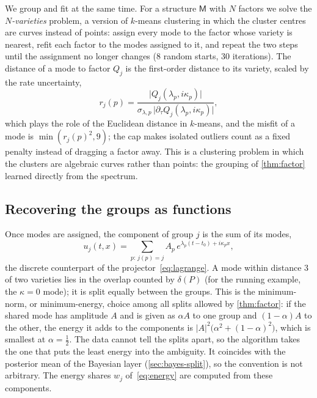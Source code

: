 \documentclass[11pt]{article}
\theoremstyle{plain}
\theoremstyle{definition}
\theoremstyle{remark}
\newcommand{\deltaP}{\delta(P)}             %
\newcommand{\Mfit}{\mathsf{M}}              %
\newcommand{\abs}[1]{\lvert#1\rvert}
\begin{document}
We group and fit at the same time. For a structure $\Mfit$ with $N$ factors we solve the
\emph{$N$-varieties} problem, a version of $k$-means clustering in which the cluster centres are curves instead of
points: assign every mode to the factor whose variety is nearest, refit each factor to the modes assigned to it, and
repeat the two steps until the assignment no longer changes (8 random starts, 30 iterations). The distance of a mode to factor $Q_j$ is
the first-order distance to its variety, scaled by the rate uncertainty,
\begin{equation}\label{eq:vardist}
  r_j(p)=\frac{\abs{Q_j(\lambda_p,i\kappa_p)}}{\sigma_{\lambda,p}\,\abs{\partial_\tau Q_j(\lambda_p,i\kappa_p)}},
\end{equation}
which plays the role of the Euclidean distance in $k$-means, and the misfit of a mode is $\min(r_j(p)^2,9)$; the cap makes isolated outliers count as a fixed
penalty instead of dragging a factor away. This is a clustering problem in which the clusters are
algebraic curves rather than points: the grouping of \cref{thm:factor} learned directly from the
spectrum.



\subsection{Recovering the groups as functions}\label{sec:alg-components}
Once modes are assigned, the component of group $j$ is the sum of its modes,
\begin{equation}\label{eq:uj}
  u_j(t,x)=\sum_{p:\,j(p)=j}A_p\,e^{\lambda_p(t-t_0)+i\kappa_px},
\end{equation}
the discrete counterpart of the projector~\eqref{eq:lagrange}. A mode within distance $3$ of two
varieties lies in the overlap counted by $\deltaP$ (for the running example, the $\kappa=0$ mode); it is
split equally between the groups. This is the minimum-norm, or minimum-energy, choice among all splits allowed by
\cref{thm:factor}: if the shared mode has amplitude $A$ and is given as $\alpha A$ to one group and $(1-\alpha)A$ to the
other, the energy it adds to the components is $\abs{A}^2\big(\alpha^2+(1-\alpha)^2\big)$, which is smallest at
$\alpha=\tfrac12$. The data cannot tell the splits apart, so the algorithm takes the one that puts the least energy
into the ambiguity. It coincides with the posterior mean of the Bayesian layer (\cref{sec:bayes-split}), so the
convention is not arbitrary. The energy shares $w_j$ of~\eqref{eq:energy}
are computed from these components.
\end{document}
